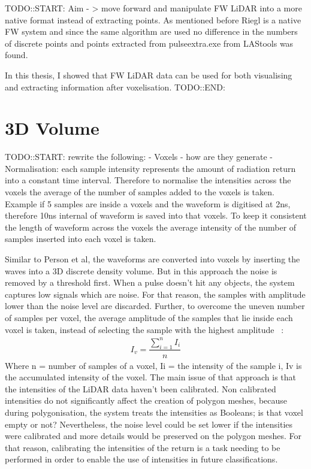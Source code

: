 \documentclass{subfiles}
\begin{document}
TODO::START:\newline
Aim - > move forward and manipulate FW LiDAR into a more native format instead of extracting points. As mentioned before Riegl is a native FW system and since the same algorithm are used no difference in the numbers of discrete points and points extracted from pulseextra.exe from LAStools was found.

In this thesis, I showed that FW LiDAR data can be used for both visualising and extracting information after voxelisation. 
TODO::END:\newline

\section{3D Volume}
TODO::START:\newline
rewrite the following:
- Voxels - how are they generate
- Normalisation: each sample intensity represents the amount of radiation return into a constant time interval. Therefore to normalise the intensities across the voxels the average of the number of samples added to the voxels is taken. Example if 5 samples are inside a voxels and the waveform is digitised at 2ns, therefore 10ns internal of waveform is saved into that voxels. To keep it consistent the length of waveform across the voxels the average intensity of the number of samples inserted into each voxel is taken. 

Similar to Person et al, the waveforms are converted into voxels by inserting the waves into a 3D discrete density volume. But in this approach the noise is removed by a threshold first. When a pulse doesn’t hit any objects, the system captures low signals which are noise. For that reason, the samples with amplitude lower than the noise level are discarded. Further, to overcome the uneven number of samples per voxel, the average amplitude of the samples that lie inside each voxel is taken, instead of selecting the sample with the highest amplitude ~\cite{Persson2005}:
	\begin{eqnarray}
		I_{v} = \dfrac{\sum_{i=1}^{n}I_{i}}{n}
	\end{eqnarray} 
Where 	n = number of samples of a voxel, 
	Ii = the intensity of the sample i, 
	Iv is the accumulated intensity of the voxel.  
The main issue of that approach is that the intensities of the LiDAR data haven’t been calibrated. Non calibrated intensities do not significantly affect the creation of polygon meshes, because during polygonisation, the system treats the intensities as Booleans; is that voxel empty or not? Nevertheless, the noise level could be set lower if the intensities were calibrated and more details would be preserved on the polygon meshes. For that reason, calibrating the intensities of the return is a task needing to be performed in order to enable the use of intensities in future classifications. 
\end{document}
